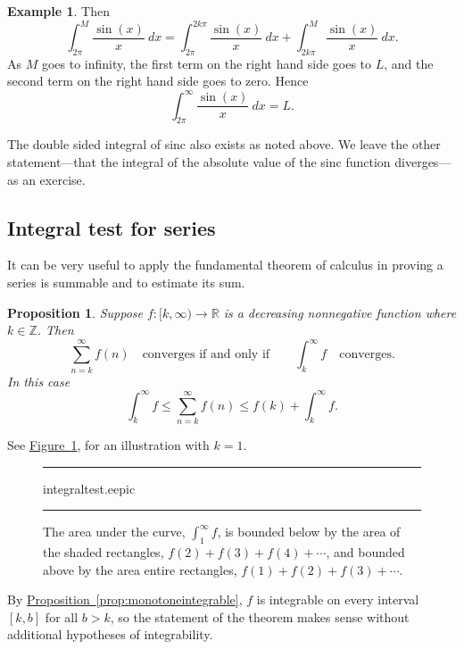 \documentclass[12pt]{book}
\newenvironment{myfigureht}{%
\begin{figure}[h!t]
\noindent\rule{\textwidth}{0.4pt}\vspace{12pt}\par\centering}%
{\par\noindent\rule{\textwidth}{0.4pt}
\end{figure}}
\newcommand{\R}{{\mathbb{R}}}
\newcommand{\Z}{{\mathbb{Z}}}
\theoremstyle{plain}
\newtheorem{prop}[thm]{Proposition}
\theoremstyle{remark}
\theoremstyle{definition}
\theoremstyle{exercise}
\theoremstyle{example}
\newtheorem{example}[thm]{Example}
\newcommand{\figureref}[1]{\hyperref[#1]{Figure~\ref*{#1}}}
\newcommand{\exerciseref}[1]{\hyperref[#1]{Exercise~\ref*{#1}}}
\newcommand{\propref}[1]{\hyperref[#1]{Proposition~\ref*{#1}}}
\begin{document}
\begin{example}
Then
\begin{equation*}
\int_{2\pi}^M \frac{\sin(x)}{x}~dx
=
\int_{2\pi}^{2k\pi} \frac{\sin(x)}{x} ~dx
+
\int_{2k\pi}^{M} \frac{\sin(x)}{x} ~dx .
\end{equation*}
As $M$ goes to infinity,
the first term on the
right hand side goes to $L$,
and the second term on the
right hand side
goes to zero.  Hence
\begin{equation*}
\int_{2\pi}^\infty \frac{\sin(x)}{x} ~dx = L .
\end{equation*}

The double sided integral of sinc also exists as noted above.
We leave the other statement---that the integral
of the absolute value of the sinc function diverges---as an exercise.
\end{example}

\subsection{Integral test for series}

It can be very useful to apply the fundamental theorem 
of calculus in proving a series is summable and to estimate its sum.

\begin{prop}
Suppose $f \colon [k,\infty) \to \R$ is a decreasing nonnegative
function where $k \in \Z$.  Then
\begin{equation*}
\sum_{n=k}^\infty f(n)
\quad \text{converges if and only if}
\qquad
\int_k^\infty f
\quad \text{converges}.
\end{equation*}
In this case 
\begin{equation*}
\int_k^\infty f
\leq
\sum_{n=k}^\infty f(n)
\leq
f(k)+
\int_k^\infty f .
\end{equation*}
\end{prop}
See \figureref{fig:integraltest}, for an illustration with $k=1$.
\begin{myfigureht}
{integraltest.eepic}
\caption{The area under the curve, 
$\int_1^\infty f$, is bounded below
by the area of the shaded rectangles,
$f(2)+f(3)+f(4)+\cdots$, and bounded above
by the area entire rectangles,
$f(1)+f(2)+f(3)+\cdots$.\label{fig:integraltest}}
\end{myfigureht}
By \propref{prop:monotoneintegrable},
$f$ is integrable
on every interval $[k,b]$ for all $b > k$, so the statement of the theorem
makes sense without additional hypotheses of integrability.
\end{document}
